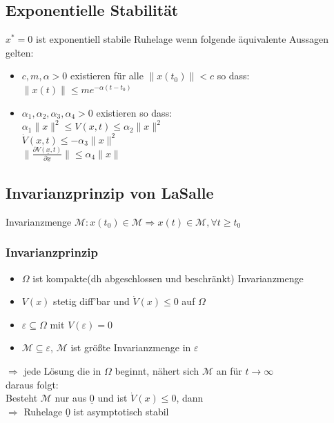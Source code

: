 \documentclass[german]{latex4ei/latex4ei_sheet}
\begin{document}
\subsection{Exponentielle Stabilität}
$x^* = 0$ ist exponentiell stabile Ruhelage wenn folgende äquivalente Aussagen gelten:
\begin{itemize}
  \item $c,m,\alpha > 0 $ existieren für alle $\|x(t_0)\| < c$ so dass: $\|x(t)\| \leq me^{-\alpha(t-t_0)}$
  \item $\alpha_1, \alpha_2, \alpha_3, \alpha_4 > 0$ existieren so dass:\\
    $\alpha_1 \|x\|^2 \leq V(x,t) \leq \alpha_2 \|x\|^2$ \\
    $\dot{V}(x,t) \leq - \alpha_3 \|x\|^2$ \\
    $\|\frac{\partial V(\underline{x},t)}{\partial \underline{x}}\| \leq \alpha_4 \|x\| $
\end{itemize}

\subsection{Invarianzprinzip von LaSalle}
Invarianzmenge $\mathcal{M}: x(t_0) \in \mathcal{M} \Rightarrow  x(t) \in \mathcal{M}, \forall t \geq t_0$

\subsubsection*{Invarianzprinzip}
\begin{itemize}
  \item $\Omega$ ist kompakte(dh abgeschlossen und beschränkt) Invarianzmenge
  \item $V(x)$ stetig diff'bar und $\dot{V}(x) \leq 0$ auf $\Omega$
  \item $\varepsilon \subseteq \Omega$ mit $V(\varepsilon) = 0$
  \item $\mathcal{M} \subseteq \varepsilon$, $\mathcal{M}$ ist größte Invarianzmenge in $\varepsilon$
\end{itemize}
$\Rightarrow$ jede Lösung die in $\Omega$ beginnt, nähert sich $\mathcal{M}$ an für $t \rightarrow \infty$ \\
daraus folgt: \\
Besteht $\mathcal{M}$ nur aus $\underline{0}$ und ist $\dot{V}(x) \leq 0$, dann \\
$\Rightarrow$ Ruhelage $\underline{0}$ ist asymptotisch stabil
\end{document}
